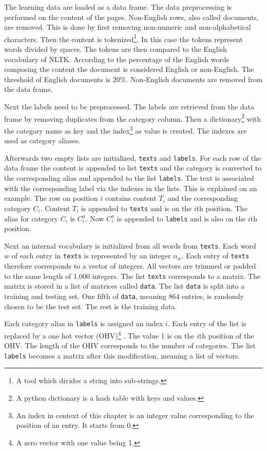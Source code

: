 The learning data are loaded as a data frame. The data preprocessing is performed on the content of the pages. Non-English rows, also called documents, are removed. This is done by first removing non-numeric and non-alphabetical characters. Then the content is tokenized\footnote{A tool which divides a string into sub-strings.}. In this case the tokens represent words divided by spaces. The tokens are then compared to the English vocabulary of NLTK. According to the percentage of the English words composing the content the document is considered English or non-English. The threshold of English documents is 20\%. Non-English documents are removed from the data frame.

Next the labels need to be preprocessed. The labels are retrieved from the data frame by removing duplicates from the category column. Then a dictionary\footnote{A python dictionary is a hash table with keys and values.} with the category name as key and the index\footnote{An index in context of this chapter is an integer value corresponding to the position of an entry. It starts from 0.} as value is created. The indexes are used as category aliases. 

Afterwards two empty lists are initialized, \texttt{texts} and \texttt{labels}. For each row of the data frame the content is appended to list \texttt{texts} and the category is converted to the corresponding alias and appended to the list \texttt{labels}. The text is associated with the corresponding label via the indexes in the lists.  This is explained on an example. The row on position $i$ contains content $T_i$ and the corresponding category $C_i$. Content $T_i$ is appended to \texttt{texts} and is on the $i$th position. The alias for category $C_i$ is $C^a_i$. Now $C^a_i$ is appended to \texttt{labels} and is also on the $i$th position.

Next an internal vocabulary is initialized from all words from \texttt{texts}. Each word $w$ of each entry in \texttt{texts} is represented by an integer $n_w$. Each entry of \texttt{texts} therefore corresponds to a vector of integers. All vectors are trimmed or padded to the same length of 1,000 integers. The list \texttt{texts} corresponds to a matrix. The matrix is stored in a list of matrices called \texttt{data}. The list \texttt{data} is split into a training and testing set. One fifth of \texttt{data}, meaning 864 entries, is randomly chosen to be the test set. The rest is the training data.

Each category alias in \texttt{labels} is assigned an index $i$. Each entry of the list is replaced by a one hot vector (OHV)\footnote{A zero vector with one value being 1.} . The value 1 is on the $i$th position of the OHV. The length of the OHV corresponds to the number of categories. The list \texttt{labels} becomes a matrix after this modification, meaning a list of vectors.

